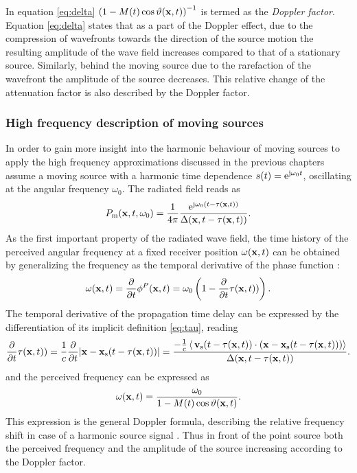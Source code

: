 In equation \eqref{eq:delta} $\left( 1 - M(t) \cos \vartheta(\mathbf{x},t) \right)^{-1}$ is termed as the \emph{Doppler factor}.
Equation \eqref{eq:delta} states that as a part of the Doppler effect, due to the compression of wavefronts towards the direction of the source motion the resulting amplitude of the wave field increases compared to that of a stationary source.
Similarly, behind the moving source due to the rarefaction of the wavefront the amplitude of the source decreases.
This relative change of the attenuation factor is also described by the Doppler factor.

\subsubsection{High frequency description of moving sources}
In order to gain more insight into the harmonic behaviour of moving sources to apply the high frequency approximations discussed in the previous chapters assume a moving source with a harmonic time dependence $s(t) = \mathrm{e}^{\mathrm{j} \omega_0 t}$, oscillating at the angular frequency $\omega_0$.
The radiated field reads as
\begin{equation}
P_{\mathrm{m}}(\mathbf{x},t,\omega_0) = \frac{1}{4\pi}\frac{\mathrm{e}^{\mathrm{j} \omega_0\left( t - \tau( \mathbf{x},t )\right)}}{\Delta(\mathbf{x},t-\tau( \mathbf{x}, t ))}.
\label{eq:harmonic_moving_source_field}
\end{equation}
As the first important property of the radiated wave field, the time history of the perceived angular frequency at a fixed receiver position $\omega(\mathbf{x},t)$ can be obtained by generalizing the frequency as the temporal derivative of the phase function \cite{Morse1968}:
\begin{equation}
\omega(\mathbf{x},t) = \frac{\partial}{\partial t}\phi^P(\mathbf{x},t) =  \omega_0 \left( 1 - \frac{\partial}{\partial t} \tau(\mathbf{x},t)) \right).
\end{equation}
The temporal derivative of the propagation time delay can be expressed by the differentiation of its implicit definition \eqref{eq:tau}, reading
\begin{equation} 
\frac{\partial}{\partial t} \tau(\mathbf{x},t)) = \frac{1}{c}\frac{\partial}{\partial t} | \mathbf{x} - \mathbf{x}_{\mathrm{s}}( t - \tau(\mathbf{x},t)) |  =
\frac{-\frac{1}{c} \left<\, \mathbf{v}_{\mathrm{s}}(t-\tau(\mathbf{x},t)) \cdot (\mathbf{x} - \mathbf{x}_{\mathrm{s}}(t-\tau(\mathbf{x},t))) \right> }{\Delta(\mathbf{x},t-\tau(\mathbf{x},t))}.
\end{equation}
and the perceived frequency can be expressed as 
\begin{equation}
\omega(\mathbf{x},t) =\frac{  \omega_0  }{1 - M(t) \cos \vartheta(\mathbf{x},t) }.
\end{equation}
This expression is the general Doppler formula, describing the relative frequency shift in case of a harmonic source signal \cite{Morse1968}. 
Thus in front of the point source both the perceived frequency and the amplitude of the source increasing according to the Doppler factor.

